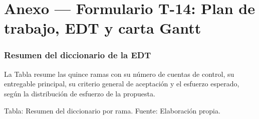\documentclass[11pt]{article}
\begin{document}
\hypersetup{pageanchor=false}
\hypersetup{pageanchor=true}
\tableofcontents
\clearpage



\clearpage
\section*{Anexo --- Formulario T-14: Plan de trabajo, EDT y carta Gantt}\label{anexo-formulario-t-14}


\subsubsection{Resumen del diccionario de la EDT}

La Tabla resume las quince ramas con su número de cuentas de control, su entregable principal, su criterio general de aceptación y el esfuerzo esperado, según la distribución de esfuerzo de la propuesta.

Tabla: Resumen del diccionario por rama. Fuente: Elaboración propia.
\end{document}
